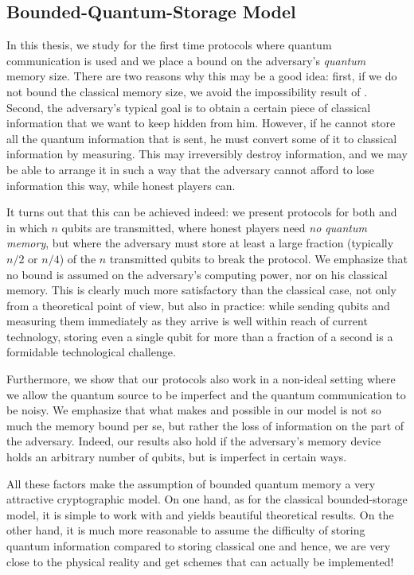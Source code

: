 \subsection{Bounded-Quantum-Storage Model}
In this thesis, we study for the
first time protocols where quantum communication is used and we place
a bound on the adversary's {\em quantum} memory size.  There are two
reasons why this may be a good idea: first, if we do not bound the
classical memory size, we avoid the impossibility result of
\cite{DM04}.  Second, the adversary's typical goal is to obtain a
certain piece of classical information that we want to keep hidden
from him. However, if he cannot store all the quantum information that
is sent, he must convert some of it to classical information by
measuring. This may irreversibly destroy information, and we may be
able to arrange it in such a way that the adversary cannot afford to lose
information this way, while honest players can.

It turns out that this can be achieved indeed: we present protocols for
both \BC and \pOT in which $n$ qubits are transmitted, where honest
players need {\em no quantum memory}, but where the adversary must
store at least a large fraction (typically $n/2$ or $n/4$) of the $n$
transmitted qubits to break the protocol. We emphasize that no bound
is assumed on the adversary's computing power, nor on his classical
memory. This is clearly much more satisfactory than the classical
case, not only from a theoretical point of view, but also in practice:
while sending qubits and measuring them immediately as they arrive is
well within reach of current technology, storing even a single qubit
for more than a fraction of a second is a formidable technological
challenge.

Furthermore, we show that our protocols also work in a non-ideal
setting where we allow the quantum source to be imperfect and the
quantum communication to be noisy. We emphasize that what makes \pOT and
\BC possible in our model is not so much the memory bound per se, but
rather the loss of information on the part of the adversary. Indeed,
our results also hold if the adversary's memory device holds an
arbitrary number of qubits, but is imperfect in certain ways.

All these factors make the assumption of bounded quantum memory a very attractive cryptographic model.
On one hand, as for the classical bounded-storage model, it is simple to work with and
yields beautiful theoretical results. On the other hand, it is much
more reasonable to assume the difficulty of storing quantum
information compared to storing classical one and hence, we are very
close to the physical reality and get schemes that can actually be
implemented!

